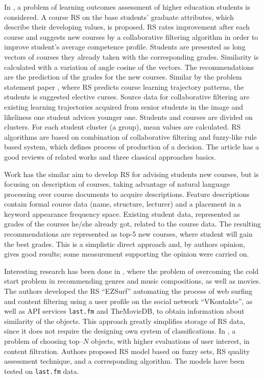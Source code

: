 \documentclass[conference,a4]{IEEEtran}
\begin{document}
In \cite{bakh}, a problem of learning outcomes assessment of higher education students is considered.  A course RS on the base students' graduate attributes, which describe their developing values, is proposed.  RS rates improvement after each course and suggests new courses by a collaborative filtering algorithm in order to improve student's average competence profile.  Students are presented as long vectors of courses they already taken with the corresponding grades.  Similarity is calculated with a variation of angle cosine of the vectors.  The recommendations are the prediction of the grades for the new courses.  Similar by the problem statement paper \cite{amer}, where RS predicts course learning trajectory patterns, the students is suggested elective curses.  Source data for collaborative filtering are existing learning trajectories acquired from senior students in the image and likeliness one student advices younger one. Students and courses are divided on clusters.  For each student cluster (a group), mean values are calculated.  RS algorithms are based on combination of collaborative filtering and fuzzy-like rule based system, which defines process of production of a decision.  The article has a good reviews of related works and three classical approaches basics.

Work \cite{naren} has the similar aim to develop RS for advising students new courses, but is focusing on description of courses, taking advantage of natural language processing over course documents to acquire descriptions.  Feature descriptions contain formal course data (name, structure, lecturer) and a placement in a keyword appearance frequency space.  Existing student data, represented as grades of the courses he/she already got, related to the course data.  The resulting recommendations are represented as top-5 new courses, where student will gain the best grades.  This is a simplistic direct approach and, by authors opinion, gives good results; some measurement supporting the opinion were carried on.



Interesting research has been done in \cite{br10}, where the problem of overcoming the cold start problem in recommending genres and music compositions, as well as movies.  The authors developed the RS ``EZSurf'' automating the process of web surfing and content filtering using a user profile on the social network ``VKontakte'', as well as API services \texttt{last.fm} and TheMovieDB, to obtain information about similarity of the objects.  This approach greatly simplifies storage of RS data, since it does not require the designing own system of classifications.  In \cite{br14}, a problem of choosing top--$N$ objects, with higher evaluations of user interest, in content filtration.  Authors proposed RS model based on fuzzy sets, RS quality assessment technique, and a corresponding algorithm.  The models have been tested on \texttt{last.fm} data.
\end{document}
